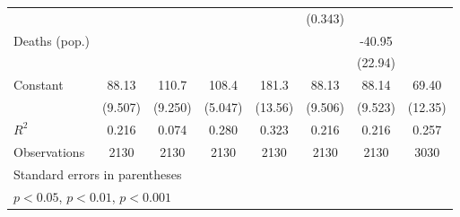 \documentclass{article}
\begin{document}
{\begin{longtable}{l*{7}{c}}
                &                  &                  &                  &                  &  (0.343)         &                  &                  \\
Deaths (pop.)   &                  &                  &                  &                  &                  &   -40.95         &                  \\
                &                  &                  &                  &                  &                  &  (22.94)         &                  \\
Constant        &    88.13\sym{***}&    110.7\sym{***}&    108.4\sym{***}&    181.3\sym{***}&    88.13\sym{***}&    88.14\sym{***}&    69.40\sym{***}\\
                &  (9.507)         &  (9.250)         &  (5.047)         &  (13.56)         &  (9.506)         &  (9.523)         &  (12.35)         \\
\hline
\(R^{2}\)       &    0.216         &    0.074         &    0.280         &    0.323         &    0.216         &    0.216         &    0.257         \\
Observations    &     2130         &     2130         &     2130         &     2130         &     2130         &     2130         &     3030         \\
\hline\hline
\multicolumn{8}{l}{\footnotesize Standard errors in parentheses}\\
\multicolumn{8}{l}{\footnotesize \sym{*} \(p<0.05\), \sym{**} \(p<0.01\), \sym{***} \(p<0.001\)}\\
\end{longtable}
}
\end{document}
